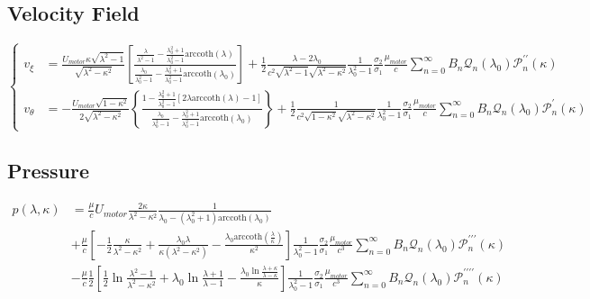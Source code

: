\documentclass[fontsize=11pt, %
                             paper=a4, %
                             twoside, %
                             captions=tableheading,
                             index=totoc,
                             hyperref]{labbook}
\begin{document}
\begin{addmargin}[4cm]{0cm}
\subsection{Velocity Field}
\begin{equation}
\left\{
\begin{aligned}
v_\xi&=\frac{U_{motor}\kappa\sqrt{\lambda^2-1}}{\sqrt{\lambda^2-\kappa^2}}\left[\frac{\frac{\lambda}{\lambda^2-1}-\frac{\lambda_0^2+1}{\lambda_0^2-1}\mathrm{arccoth}(\lambda)}{\frac{\lambda_0}{\lambda_0^2-1}-\frac{\lambda_0^2+1}{\lambda_0^2-1}\mathrm{arccoth}(\lambda_0)}\right]+\frac{1}{2}\frac{\lambda-2\lambda_0}{c^2\sqrt{\lambda^2-1}\sqrt{\lambda^2-\kappa^2}}\frac{1}{\lambda_0^2-1}\frac{\sigma_2}{\sigma_1}\frac{\mu_{motor}}{c}\sum_{n=0}^\infty B_n\mathscr{Q}_n(\lambda_0)\mathscr{P}_n^{\prime\prime}(\kappa)\\
v_\theta&=-\frac{U_{motor}\sqrt{1-\kappa^2}}{2\sqrt{\lambda^2-\kappa^2}}\left\{\frac{1-\frac{\lambda_0^2+1}{\lambda_0^2-1}\left[2\lambda\mathrm{arccoth}(\lambda)-1\right]}{\frac{\lambda_0}{\lambda_0^2-1}-\frac{\lambda_0^2+1}{\lambda_0^2-1}\mathrm{arccoth}(\lambda_0)}\right\}+\frac{1}{2}\frac{1}{c^2\sqrt{1-\kappa^2}\sqrt{\lambda^2-\kappa^2}}\frac{1}{\lambda_0^2-1}\frac{\sigma_2}{\sigma_1}\frac{\mu_{motor}}{c}\sum_{n=0}^\infty B_n \mathscr{Q}_n(\lambda_0)\mathscr{P}_n^\prime(\kappa)
\end{aligned}
\right.
\end{equation}
\subsection{Pressure}
\begin{equation}
\begin{aligned}
p(\lambda,\kappa)&=\frac{\mu}{c}U_{motor}\frac{2\kappa}{\lambda^2-\kappa^2}\frac{1}{\lambda_0-(\lambda_0^2+1)\mathrm{arccoth}(\lambda_0)}\\
&+\frac{\mu}{c}
\left[-\frac{1}{2}\frac{\kappa}{\lambda^2-\kappa^2}+\frac{\lambda_0\lambda}{\kappa(\lambda^2-\kappa^2)}-\frac{\lambda_0\mathrm{arccoth}(\frac{\lambda}{\kappa})}{\kappa^2}\right]
\frac{1}{\lambda_0^2-1}\frac{\sigma_2}{\sigma_1}\frac{\mu_{motor}}{c^3}\sum_{n=0}^\infty B_n \mathscr{Q}_n(\lambda_0)\mathscr{P}_n^{\prime\prime\prime}(\kappa)\\
&-\frac{\mu}{c}\frac{1}{2}
\left[\frac{1}{2}\ln \frac{\lambda^2-1}{\lambda^2-\kappa^2}+\lambda_0\ln\frac{\lambda+1}{\lambda-1}-\frac{\lambda_0\ln\frac{\lambda+\kappa}{\lambda-\kappa}}{\kappa}\right]
\frac{1}{\lambda_0^2-1}\frac{\sigma_2}{\sigma_1}\frac{\mu_{motor}}{c^3}\sum_{n=0}^\infty B_n \mathscr{Q}_n(\lambda_0)\mathscr{P}_n^{\prime\prime\prime\prime}(\kappa)\\
\end{aligned}
\end{equation}

\end{addmargin}
\end{document}
